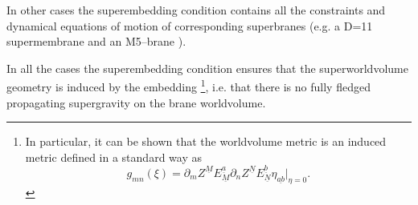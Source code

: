 \documentclass[a4paper,12pt]{article}
\begin{document}
In other cases the superembedding condition contains all the
constraints and dynamical equations of motion of corresponding
superbranes (e.g. a D=11 supermembrane \cite{bpstv} and an
M5--brane \cite{hs}).

In all the cases the superembedding condition ensures that the
superworldvolume geometry is induced by the embedding
\footnote{In particular, it can be shown that the worldvolume
metric is an induced metric defined in a standard way as
\begin{equation}\label{indmet}
g_{mn}(\xi)=\partial_mZ^{\underline M}E_{\underline M}^{\underline
a}\partial_nZ^{\underline N} E_{\underline N}^{\underline
b}\eta_{\underline{ab}}|_{\eta=0}.
\end{equation}},
i.e. that there is no fully fledged propagating supergravity on
the brane worldvolume.
\end{document}
